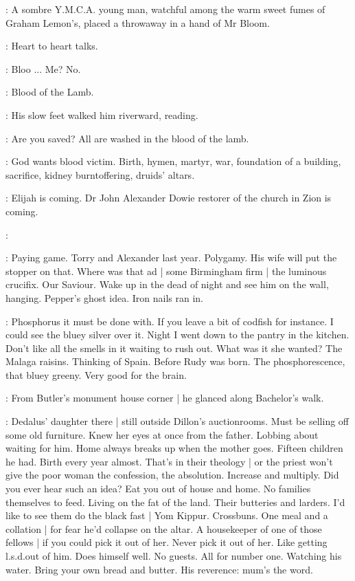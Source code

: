 :
A sombre Y.M.C.A. young man,
watchful among the warm sweet fumes of Graham Lemon's,
placed a throwaway in a hand of Mr Bloom.

:
Heart to heart talks.

\BloomInt:
Bloo ...
Me?
No.

\BloomInt:
Blood of the Lamb.


:
His slow feet walked him riverward, reading.

:
Are you saved?
All are washed in the blood of the lamb.

\BloomInt:
God wants blood victim.
Birth, hymen, martyr, war,
foundation of a building,
sacrifice,
kidney burntoffering,
druids' altars.

:
Elijah is coming.
Dr John Alexander Dowie restorer of the church in Zion is coming.

:

\BloomInt:
Paying game.
Torry and Alexander last year.
Polygamy.
His wife will put the stopper on that.
Where was that ad |
some Birmingham firm |
the luminous crucifix.
Our Saviour.
Wake up in the dead of night and see him on the wall, hanging.
Pepper's ghost idea.
Iron nails ran in.

\BloomInt:
Phosphorus it must be done with.
If you leave a bit of codfish for instance.
I could see the bluey silver over it.
Night I went down to the pantry in the kitchen.
Don't like all the smells in it waiting to rush out.
What was it she wanted?
The Malaga raisins.
Thinking of Spain.
Before Rudy was born.
The phosphorescence, that bluey greeny.
Very good for the brain.

:
From Butler's monument house corner |
he glanced along Bachelor's walk.

\BloomInt:
Dedalus' daughter there |
still outside Dillon's auctionrooms.
Must be selling off some old furniture.
Knew her eyes at once from the father.
Lobbing about waiting for him.
Home always breaks up when the mother goes.
Fifteen children he had.
Birth every year almost.
That's in their theology |
or the priest won't give the poor woman
the confession,
the absolution.
Increase and multiply.
Did you ever hear such an idea?
Eat you out of house and home.
No families themselves to feed.
Living on the fat of the land.
Their butteries and larders.
I'd like to see them do the black fast |
Yom Kippur.
Crossbuns.
One meal and a collation |
for fear he'd collapse on the altar.
A housekeeper of one of those fellows |
if you could pick it out of her.
Never pick it out of her.
Like getting l.s.d.\@ out of him.
Does himself well.
No guests.
All for number one.
Watching his water.
Bring your own bread and butter.
His reverence:
mum's the word.

